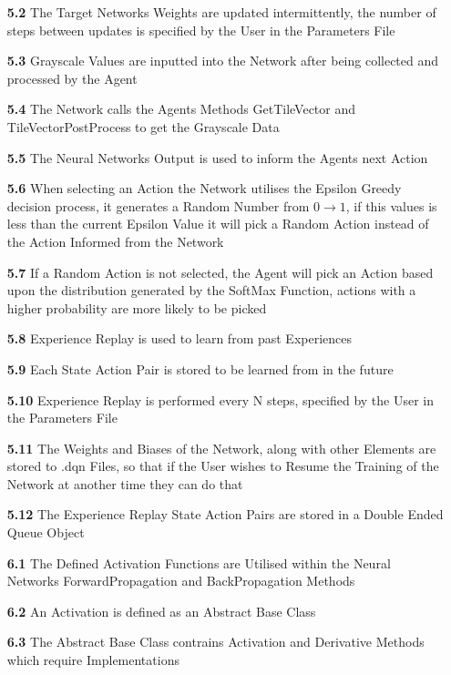 \begin{flushleft}
\begin{itemize}
            \item[\textbf{5.2}] The Target Networks Weights are updated intermittently, the number of steps between updates is specified by the User in the Parameters File
            \item[\textbf{5.3}] Grayscale Values are inputted into the Network after being collected and processed by the Agent
            \item[\textbf{5.4}] The Network calls the Agents Methods \textsf{GetTileVector} and \textsf{TileVectorPostProcess} to get the Grayscale Data
            \item[\textbf{5.5}] The Neural Networks Output is used to inform the Agents next Action
            \item[\textbf{5.6}] When selecting an Action the Network utilises the Epsilon Greedy decision process, it generates a Random Number from $0\to 1$, if this values is less than the current Epsilon Value it will pick a Random Action instead of the Action Informed from the Network
            \item[\textbf{5.7}] If a Random Action is not selected, the Agent will pick an Action based upon the distribution generated by the SoftMax Function, actions with a higher probability are more likely to be picked
            \item[\textbf{5.8}] Experience Replay is used to learn from past Experiences
            \item[\textbf{5.9}] Each State Action Pair is stored to be learned from in the future
            \item[\textbf{5.10}] Experience Replay is performed every N steps, specified by the User in the Parameters File
            \item[\textbf{5.11}] The Weights and Biases of the Network, along with other Elements are stored to .dqn Files, so that if the User wishes to Resume the Training of the Network at another time they can do that
            \item[\textbf{5.12}] The Experience Replay State Action Pairs are stored in a Double Ended Queue Object
            \item[\textbf{6.1}] The Defined Activation Functions are Utilised within the Neural Networks \textsf{ForwardPropagation} and \textsf{BackPropagation} Methods
            \item[\textbf{6.2}] An \textsf{Activation} is defined as an Abstract Base Class 
            \item[\textbf{6.3}] The Abstract Base Class contrains \textsf{Activation} and \textsf{Derivative} Methods which require Implementations

\end{itemize}
\end{flushleft}
